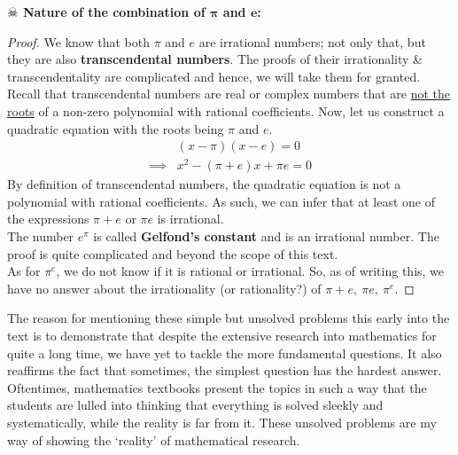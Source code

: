 \noindent \textbf{\(\skull\) Nature of the combination of $\pmb{\pi}$ and $\pmb{e}$:}
\begin{proof}
    We know that both $\pi$ and $e$ are irrational numbers; not only that, but they are also \textbf{transcendental numbers}. The proofs of their irrationality \& transcendentality are complicated and hence, we will take them for granted. Recall that transcendental numbers are real or complex numbers that are \underline{not the roots} of a non-zero polynomial with rational coefficients. Now, let us construct a quadratic equation with the roots being $\pi$ and $e$.
    \begin{align*}
        &(x-\pi)(x-e)=0\\
        \implies& x^2-(\pi+e)x+\pi e=0
    \end{align*}
    By definition of transcendental numbers, the quadratic equation is not a polynomial with rational coefficients. As such, we can infer that at least one of the expressions $\pi+e$ or $\pi e$ is irrational.\\
    The number $e^{\pi}$ is called \textbf{Gelfond's constant} and is an irrational number. The proof is quite complicated and beyond the scope of this text.\\
    As for $\pi^e$, we do not know if it is rational or irrational. So, as of writing this, we have no answer about the irrationality (or rationality?) of $\pi+e,\ \pi e,\ \pi^e$.
\end{proof}    
\noindent The reason for mentioning these simple but unsolved problems this early into the text is to demonstrate that despite the extensive research into mathematics for quite a long time, we have yet to tackle the more fundamental questions. It also reaffirms the fact that sometimes, the simplest question has the hardest answer. Oftentimes, mathematics textbooks present the topics in such a way that the students are lulled into thinking that everything is solved sleekly and systematically, while the reality is far from it. These unsolved problems are my way of showing the `reality' of mathematical research.
\exercise
